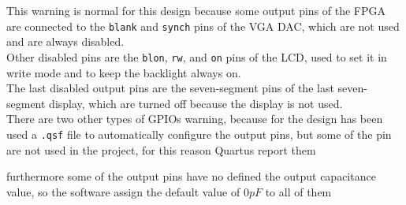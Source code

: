 \begin{warningbox}[Warning]
     \newline
     \newline
     \newline
     \newline
     \newline
     \newline
\end{warningbox}

\noindent
This warning is normal for this design because some output pins of the FPGA are connected to the \texttt{blank} and \texttt{synch} pins of the VGA DAC, which are not used and are always disabled. \\
Other disabled pins are the \texttt{blon}, \texttt{rw}, and \texttt{on} pins of the LCD, used to set it in write mode and to keep the backlight always on. \\
The last disabled output pins are the seven-segment pins of the last seven-segment display, which are turned off because the display is not used. \\
There are two other types of GPIOs warning, because for the design has been used a \texttt{.qsf} file to automatically configure the output pins, but some of the pin are not used in the project, for this reason Quartus report them

\begin{warningbox}[Warning]
     \newline
\end{warningbox}

\newpage
\noindent
furthermore some of the output pins have no defined the output capacitance value, so the software assign the default value of \(0 pF\) to all of them

\begin{warningbox}[Warning]
\end{warningbox}

